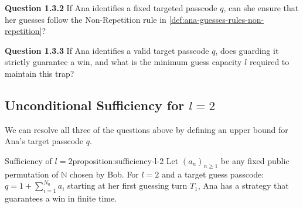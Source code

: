 \begin{questionbox}
\textbf{Question 1.3.2}
If Ana identifies a fixed targeted passcode $q$, can she ensure that her guesses follow the Non-Repetition rule in \ref{def:ana-guesses-rules-non-repetition}?
\end{questionbox}

\begin{questionbox}
\textbf{Question 1.3.3}
If Ana identifies a valid target passcode $q$, does guarding it strictly guarantee a win, and what is the minimum guess capacity $l$ required to maintain this trap?
\end{questionbox}


\subsection{Unconditional Sufficiency for $l=2$}

We can resolve all three of the questions above by defining an upper bound for Ana's target passcode $q$.

\begin{proposition}{Sufficiency of $l=2$}{proposition:sufficiency-l-2} \label{prop:sufficienty-l=2}
Let $(a_n)_{n \ge 1}$ be any fixed public permutation of $\mathbb{N}$ chosen by Bob. For $l=2$ and a target guess passcode: $q = 1 + \sum_{i=1}^{N_0} a_i$ starting at her first guessing turn $T_1$, Ana has a strategy that guarantees a win in finite time.
\end{proposition}

